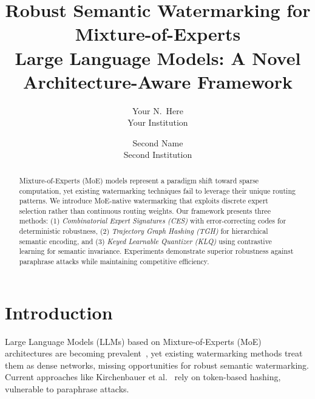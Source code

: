 \documentclass[letterpaper,twocolumn,10pt]{article}
\begin{document}

\date{}

\title{\Large \bf Robust Semantic Watermarking for Mixture-of-Experts\\
  Large Language Models: A Novel Architecture-Aware Framework}

\author{
{\rm Your N.\ Here}\\
Your Institution
\and
{\rm Second Name}\\
Second Institution
} %

\maketitle

\begin{abstract}
Mixture-of-Experts (MoE) models represent a paradigm shift toward sparse computation, yet existing watermarking techniques fail to leverage their unique routing patterns. We introduce MoE-native watermarking that exploits discrete expert selection rather than continuous routing weights. Our framework presents three methods: (1) \textit{Combinatorial Expert Signatures (CES)} with error-correcting codes for deterministic robustness, (2) \textit{Trajectory Graph Hashing (TGH)} for hierarchical semantic encoding, and (3) \textit{Keyed Learnable Quantizer (KLQ)} using contrastive learning for semantic invariance. Experiments demonstrate superior robustness against paraphrase attacks while maintaining competitive efficiency.
\end{abstract}

\section{Introduction}

Large Language Models (LLMs) based on Mixture-of-Experts (MoE) architectures are becoming prevalent~\cite{jiang2024mixtral}, yet existing watermarking methods treat them as dense networks, missing opportunities for robust semantic watermarking. Current approaches like Kirchenbauer et al.~\cite{kirchenbauer2023watermark} rely on token-based hashing, vulnerable to paraphrase attacks.
\end{document}
